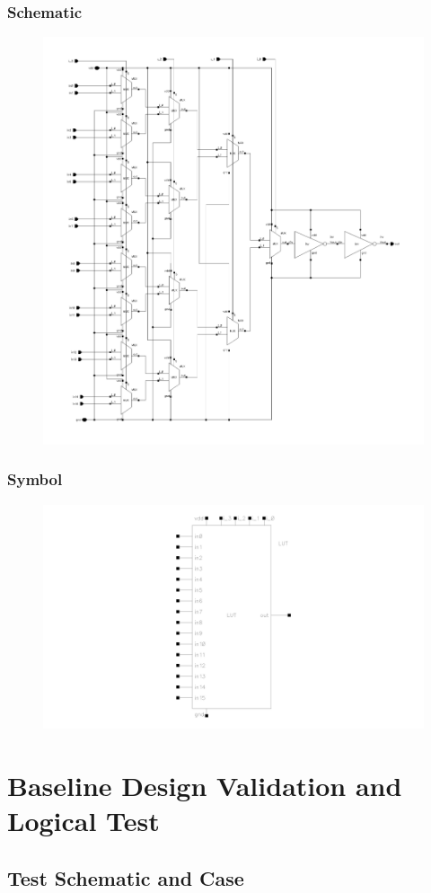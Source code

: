 \documentclass[12pt]{article}
\begin{document}
\subsubsection*{Schematic}
\begin{figure}[H]
    \centering
    \includegraphics[width=0.5\linewidth]{writeup//figures/LUT_sch.png}
    \caption{}
\end{figure}

\subsubsection*{Symbol}
\begin{figure}[H]
    \centering
    \includegraphics[width=0.8\linewidth]{writeup//figures/LUT_sym.png}
    \caption{}
\end{figure}

\newpage

\section{Baseline Design Validation and Logical Test}
\subsection{Test Schematic and Case}
\end{document}

